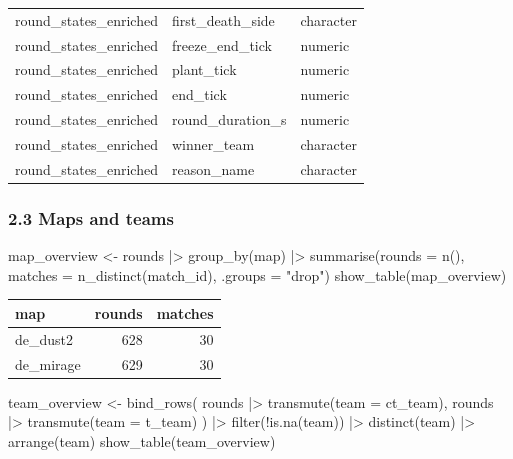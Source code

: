 \documentclass[
  letterpaper,
  DIV=11,
  numbers=noendperiod]{scrartcl}
\newenvironment{Shaded}{\begin{snugshade}}{\end{snugshade}}
\newcommand{\AttributeTok}[1]{\textcolor[rgb]{0.40,0.45,0.13}{#1}}
\newcommand{\FunctionTok}[1]{\textcolor[rgb]{0.28,0.35,0.67}{#1}}
\newcommand{\NormalTok}[1]{\textcolor[rgb]{0.00,0.23,0.31}{#1}}
\newcommand{\OtherTok}[1]{\textcolor[rgb]{0.00,0.23,0.31}{#1}}
\newcommand{\SpecialCharTok}[1]{\textcolor[rgb]{0.37,0.37,0.37}{#1}}
\newcommand{\StringTok}[1]{\textcolor[rgb]{0.13,0.47,0.30}{#1}}
\newcounter{none} %
\begin{document}
{\begin{longtable}[]{@{}lll@{}}
round\_states\_enriched & first\_death\_side & character \\
round\_states\_enriched & freeze\_end\_tick & numeric \\
round\_states\_enriched & plant\_tick & numeric \\
round\_states\_enriched & end\_tick & numeric \\
round\_states\_enriched & round\_duration\_s & numeric \\
round\_states\_enriched & winner\_team & character \\
round\_states\_enriched & reason\_name & character \\
\end{longtable}
}

\subsubsection{2.3 Maps and teams}\label{maps-and-teams}

\begin{Shaded}
\begin{Highlighting}[]
\NormalTok{map\_overview }\OtherTok{\textless{}{-}}\NormalTok{ rounds }\SpecialCharTok{|\textgreater{}}
  \FunctionTok{group\_by}\NormalTok{(map) }\SpecialCharTok{|\textgreater{}}
  \FunctionTok{summarise}\NormalTok{(}\AttributeTok{rounds =} \FunctionTok{n}\NormalTok{(), }\AttributeTok{matches =} \FunctionTok{n\_distinct}\NormalTok{(match\_id), }\AttributeTok{.groups =} \StringTok{"drop"}\NormalTok{)}
\FunctionTok{show\_table}\NormalTok{(map\_overview)}
\end{Highlighting}
\end{Shaded}

{\def\LTcaptype{none} %
\begin{longtable}[]{@{}lrr@{}}
\toprule\noalign{}
map & rounds & matches \\
\midrule\noalign{}
\endhead
\bottomrule\noalign{}
\endlastfoot
de\_dust2 & 628 & 30 \\
de\_mirage & 629 & 30 \\
\end{longtable}
}

\begin{Shaded}
\begin{Highlighting}[]
\NormalTok{team\_overview }\OtherTok{\textless{}{-}} \FunctionTok{bind\_rows}\NormalTok{(}
\NormalTok{  rounds }\SpecialCharTok{|\textgreater{}} \FunctionTok{transmute}\NormalTok{(}\AttributeTok{team =}\NormalTok{ ct\_team),}
\NormalTok{  rounds }\SpecialCharTok{|\textgreater{}} \FunctionTok{transmute}\NormalTok{(}\AttributeTok{team =}\NormalTok{ t\_team)}
\NormalTok{) }\SpecialCharTok{|\textgreater{}}
  \FunctionTok{filter}\NormalTok{(}\SpecialCharTok{!}\FunctionTok{is.na}\NormalTok{(team)) }\SpecialCharTok{|\textgreater{}}
  \FunctionTok{distinct}\NormalTok{(team) }\SpecialCharTok{|\textgreater{}}
  \FunctionTok{arrange}\NormalTok{(team)}
\FunctionTok{show\_table}\NormalTok{(team\_overview)}
\end{Highlighting}
\end{Shaded}
\end{document}

